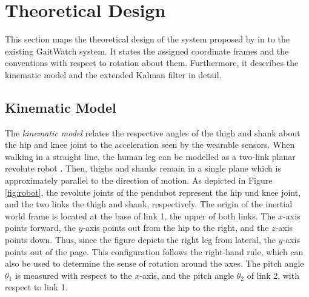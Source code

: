 \section{Theoretical Design}\label{sec:theoretical_design}

This section maps the theoretical design of the system proposed by \citeauthor{bennett_motion_2014} in \cite{bennett_motion_2014} to the existing GaitWatch system. It states the assigned coordinate frames and the conventions with respect to rotation about them. Furthermore, it describes the kinematic model and the extended Kalman filter in detail.

\subsection{Kinematic Model}

The \emph{kinematic model} relates the respective angles of the thigh and shank about the hip and knee joint to the acceleration seen by the wearable sensors. When walking in a straight line, the human leg can be modelled as a two-link planar revolute robot \cite{bennett_motion_2014}. Then, thighs and shanks remain in a single plane which is approximately parallel to the direction of motion. As depicted in Figure \ref{fig:robot}, the revolute joints of the \gls{pendubot} represent the hip und knee joint, and the two links the thigh and shank, respectively. The origin of the inertial world frame is located at the base of link 1, the upper of both links. The $x$-axis points forward, the $y$-axis points out from the hip to the right, and the $z$-axis points down. Thus, since the figure depicts the right leg from lateral, the $y$-axis points out of the page. This configuration follows the right-hand rule, which can also be used to determine the sense of rotation around the axes. The pitch angle $\theta_1$ is measured with respect to the $x$-axis, and the pitch angle $\theta_2$ of link 2, with respect to link 1. 

